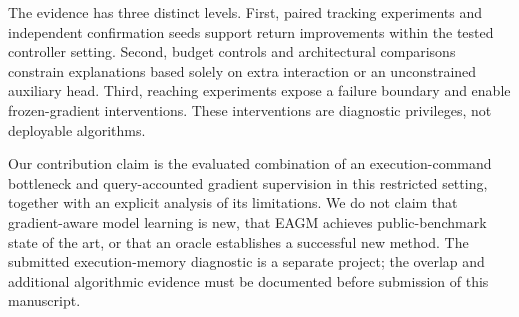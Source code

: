 The evidence has three distinct levels. First, paired tracking experiments and independent confirmation seeds support return improvements within the tested controller setting. Second, budget controls and architectural comparisons constrain explanations based solely on extra interaction or an unconstrained auxiliary head. Third, reaching experiments expose a failure boundary and enable frozen-gradient interventions. These interventions are diagnostic privileges, not deployable algorithms.

Our contribution claim is the evaluated combination of an execution-command bottleneck and query-accounted gradient supervision in this restricted setting, together with an explicit analysis of its limitations. We do not claim that gradient-aware model learning is new, that EAGM achieves public-benchmark state of the art, or that an oracle establishes a successful new method. The submitted execution-memory diagnostic is a separate project; the overlap and additional algorithmic evidence must be documented before submission of this manuscript.
